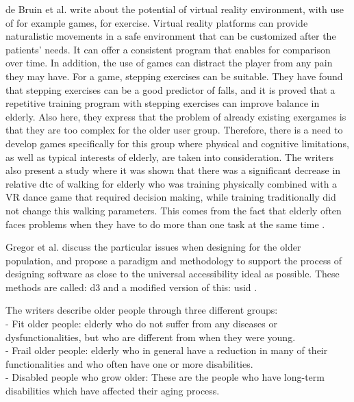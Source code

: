 de Bruin et al. \cite{bruin} write about the potential of virtual reality environment, with use of for example games, for exercise. Virtual reality platforms can provide naturalistic movements in a safe environment that can be customized after the patients' needs. It can offer a consistent program that enables for comparison over time. In addition, the use of games can distract the player from any pain they may have. For a game, stepping exercises can be suitable. They have found that stepping exercises can be a good predictor of falls, and it is proved that a repetitive training program with stepping exercises can improve balance in elderly. Also here, they express that the problem of already existing exergames is that they are too complex for the older user group. Therefore, there is a need to develop games specifically for this group where physical and cognitive limitations, as well as typical interests of elderly, are taken into consideration. The writers also present a study where it was shown that there was a significant decrease in relative \ac{dtc} of walking for elderly who was training physically combined with a VR dance game that required decision making, while training traditionally did not change this walking parameters. This comes from the fact that elderly often faces problems when they have to do more than one task at the same time \cite{bruin}.

Gregor et al. \cite{gregor} discuss the particular issues when designing for the older population, and propose a paradigm and methodology to support the process of designing software as close to the universal accessibility ideal as possible. These methods are called: \ac{d3} and a modified version of this: \ac{usid} \cite{gregor}.

The writers describe older people through three different groups:\\ 
- Fit older people: elderly who do not suffer from any diseases or dysfunctionalities, but who are different from when they were young.\\
- Frail older people: elderly who in  general have a reduction in many of their functionalities and who often have one or more disabilities.\\
- Disabled people who grow older: These are the people who have long-term disabilities which have affected their aging process.


